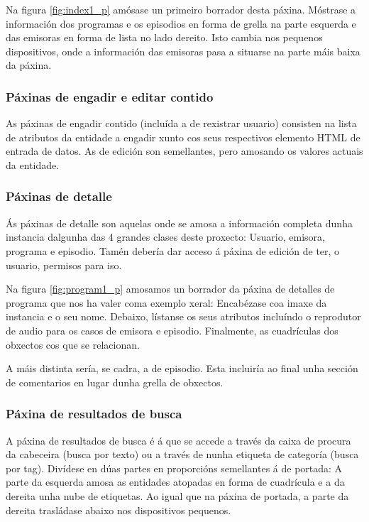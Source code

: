 Na figura \ref{fig:index1_p} amósase un primeiro borrador desta páxina. Móstrase a información dos programas e os episodios en forma de grella na parte esquerda e das emisoras en forma de lista no lado dereito. Isto cambia nos pequenos dispositivos, onde a información das emisoras pasa a situarse na parte máis baixa da páxina.


\subsubsection{Páxinas de engadir e editar contido}

As páxinas de engadir contido (incluída a de rexistrar usuario) consisten na lista de atributos da entidade a engadir xunto cos seus respectivos elemento HTML de entrada de datos. As de edición son semellantes, pero amosando os valores actuais da entidade.

\subsubsection{Páxinas de detalle}

Ás páxinas de detalle son aquelas onde se amosa a información completa dunha instancia dalgunha das 4 grandes clases deste proxecto: Usuario, emisora, programa e episodio. Tamén debería dar acceso á páxina de edición de ter, o usuario, permisos para iso.

Na figura \ref{fig:program1_p} amosamos un borrador da páxina de detalles de programa que nos ha valer coma exemplo xeral: Encabézase coa imaxe da instancia e o seu nome. Debaixo, lístanse os seus atributos incluíndo o reprodutor de audio para os casos de emisora e episodio. Finalmente, as cuadrículas dos obxectos cos que se relacionan.

A máis distinta sería, se cadra, a de episodio. Esta incluiría ao final unha sección de comentarios en lugar dunha grella de obxectos.


\subsubsection{Páxina de resultados de busca}

A páxina de resultados de busca é á que se accede a través da caixa de procura da cabeceira (busca por texto) ou a través de  nunha etiqueta de categoría (busca por tag). Divídese en dúas partes en proporcións semellantes á de portada: A parte da esquerda amosa as entidades atopadas en forma de cuadrícula e a da dereita unha nube de etiquetas. Ao igual que na páxina de portada, a parte da dereita trasládase abaixo nos dispositivos pequenos.


